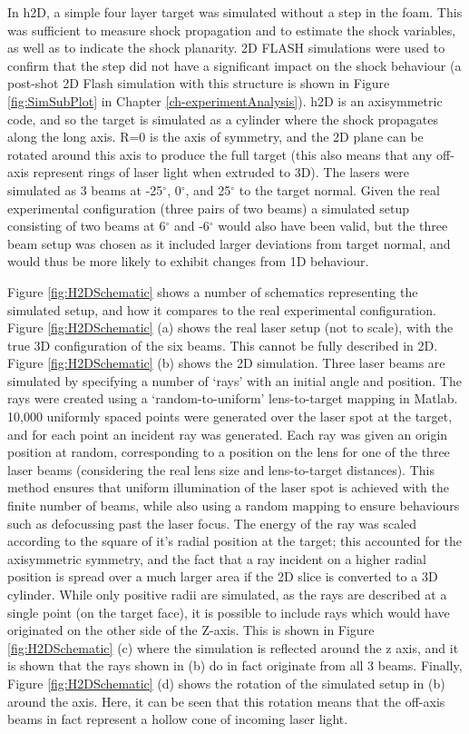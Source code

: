 In h2D, a simple four layer target was simulated without a step in the foam. This was sufficient to measure shock propagation and to estimate the shock variables, as well as to indicate the shock planarity. 2D FLASH simulations were used to confirm that the step did not have a significant impact on the shock behaviour (a post-shot 2D Flash simulation with this structure is shown in Figure \ref{fig:SimSubPlot} in Chapter \ref{ch-experimentAnalysis}). h2D is an axisymmetric code, and so the target is simulated as a cylinder where the shock propagates along the long axis. R=0 is the axis of symmetry, and the 2D plane can be rotated around this axis to produce the full target (this also means that any off-axis represent rings of laser light when extruded to 3D). The lasers were simulated as 3 beams at -25$^{\circ}$, 0$^{\circ}$, and 25$^{\circ}$ to the target normal. Given the real experimental configuration (three pairs of two beams) a simulated setup consisting of two beams at 6$^{\circ}$ and -6$^{\circ}$ would also have been valid, but the three beam setup was chosen as it included larger deviations from target normal, and would thus be more likely to exhibit changes from 1D behaviour. 

Figure \ref{fig:H2DSchematic} shows a number of schematics representing the simulated setup, and how it compares to the real experimental configuration. Figure \ref{fig:H2DSchematic} (a) shows the real laser setup (not to scale), with the true 3D configuration of the six beams. This cannot be fully described in 2D. Figure \ref{fig:H2DSchematic} (b) shows the 2D simulation. Three laser beams are simulated by specifying a number of `rays' with an initial angle and position. The rays were created using a `random-to-uniform' lens-to-target mapping in Matlab. 10,000 uniformly spaced points were generated over the laser spot at the target, and for each point an incident ray was generated. Each ray was given an origin position at random, corresponding to a position on the lens for one of the three laser beams (considering the real lens size and lens-to-target distances). This method ensures that uniform illumination of the laser spot is achieved with the finite number of beams, while also using a random mapping to ensure behaviours such as defocussing past the laser focus. The energy of the ray was scaled according to the square of it's radial position at the target; this accounted for the axisymmetric symmetry, and the fact that a ray incident on a higher radial position is spread over a much larger area if the 2D slice is converted to a 3D cylinder. While only positive radii are simulated, as the rays are described at a single point (on the target face), it is possible to include rays which would have originated on the other side of the Z-axis. This is shown in Figure \ref{fig:H2DSchematic} (c) where the simulation is reflected around the z axis, and it is shown that the rays shown in (b) do in fact originate from all 3 beams. Finally, Figure \ref{fig:H2DSchematic} (d) shows the rotation of the simulated setup in (b) around the axis. Here, it can be seen that this rotation means that the off-axis beams in fact represent a hollow cone of incoming laser light.

